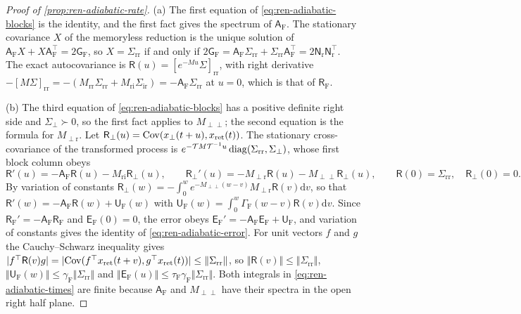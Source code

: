 \begin{proof}[Proof of \cref{prop:ren-adiabatic-rate}]
(a) The first equation of \eqref{eq:ren-adiabatic-blocks} is the identity, and the first fact gives the spectrum of $\mathsf A_{\mathrm F}$. The stationary covariance $X$ of the memoryless reduction is the unique solution of $\mathsf A_{\mathrm F}X+X\mathsf A_{\mathrm F}^\top=2\mathsf G_{\mathrm F}$, so $X=\Sigma_{\mathrm{rr}}$ if and only if $2\mathsf G_{\mathrm F}=\mathsf A_{\mathrm F}\Sigma_{\mathrm{rr}}+\Sigma_{\mathrm{rr}}\mathsf A_{\mathrm F}^\top=2\mathsf N_{\mathrm r}\mathsf N_{\mathrm r}^\top$. The exact autocovariance is $\mathsf R(u)=[e^{-Mu}\Sigma]_{\mathrm{rr}}$, with right derivative $-[M\Sigma]_{\mathrm{rr}}=-(M_{\mathrm{rr}}\Sigma_{\mathrm{rr}}+M_{\mathrm{ri}}\Sigma_{\mathrm{ir}})=-\mathsf A_{\mathrm F}\Sigma_{\mathrm{rr}}$ at $u=0$, which is that of $\mathsf R_{\mathrm F}$.

(b) The third equation of \eqref{eq:ren-adiabatic-blocks} has a positive definite right side and $\Sigma_\perp\succ0$, so the first fact applies to $M_{\perp\perp}$; the second equation is the formula for $M_{\perp\mathrm r}$. Let $\mathsf R_\perp(u)=\operatorname{Cov}(x_\perp(t+u),x_{\mathrm{ret}}(t))$. The stationary cross-covariance of the transformed process is $e^{-\mathcal TM\mathcal T^{-1}u}\operatorname{diag}(\Sigma_{\mathrm{rr}},\Sigma_\perp)$, whose first block column obeys
\[
\mathsf R'(u)=-\mathsf A_{\mathrm F}\mathsf R(u)-M_{\mathrm{ri}}\mathsf R_\perp(u),\qquad\mathsf R_\perp'(u)=-M_{\perp\mathrm r}\mathsf R(u)-M_{\perp\perp}\mathsf R_\perp(u),\qquad\mathsf R(0)=\Sigma_{\mathrm{rr}},\quad\mathsf R_\perp(0)=0.
\]
By variation of constants $\mathsf R_\perp(w)=-\int_0^we^{-M_{\perp\perp}(w-v)}M_{\perp\mathrm r}\mathsf R(v)\mathrm dv$, so that $\mathsf R'(w)=-\mathsf A_{\mathrm F}\mathsf R(w)+\mathsf U_{\mathrm F}(w)$ with $\mathsf U_{\mathrm F}(w)=\int_0^w\Gamma_{\mathrm F}(w-v)\mathsf R(v)\mathrm dv$. Since $\mathsf R_{\mathrm F}'=-\mathsf A_{\mathrm F}\mathsf R_{\mathrm F}$ and $\mathsf E_{\mathrm F}(0)=0$, the error obeys $\mathsf E_{\mathrm F}'=-\mathsf A_{\mathrm F}\mathsf E_{\mathrm F}+\mathsf U_{\mathrm F}$, and variation of constants gives the identity of \eqref{eq:ren-adiabatic-error}. For unit vectors $f$ and $g$ the Cauchy--Schwarz inequality gives $\lvert f^\top\mathsf R(v)g\rvert=\lvert\operatorname{Cov}(f^\top x_{\mathrm{ret}}(t+v),g^\top x_{\mathrm{ret}}(t))\rvert\le\Vert\Sigma_{\mathrm{rr}}\Vert$, so $\Vert\mathsf R(v)\Vert\le\Vert\Sigma_{\mathrm{rr}}\Vert$, $\Vert\mathsf U_{\mathrm F}(w)\Vert\le\gamma_{\mathrm F}\Vert\Sigma_{\mathrm{rr}}\Vert$ and $\Vert\mathsf E_{\mathrm F}(u)\Vert\le\tau_{\mathrm F}\gamma_{\mathrm F}\Vert\Sigma_{\mathrm{rr}}\Vert$. Both integrals in \eqref{eq:ren-adiabatic-times} are finite because $\mathsf A_{\mathrm F}$ and $M_{\perp\perp}$ have their spectra in the open right half plane.


\end{proof}
